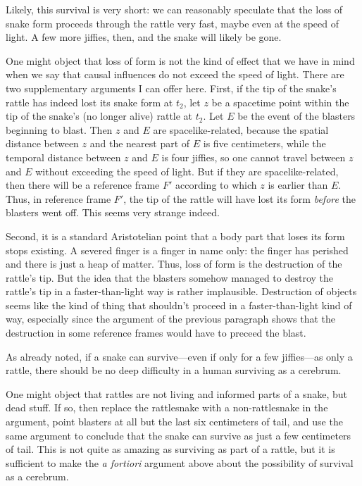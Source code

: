 Likely, this survival is very short: we can reasonably speculate that the loss of snake form proceeds through the rattle 
very fast, maybe even at the speed of light. A few more jiffies, then, and the snake will likely be gone.

One might object that loss of form is not the kind of effect that we have in mind when we say that causal influences do not 
exceed the speed of light. There are two supplementary arguments I can offer here. First, if the tip of the snake's rattle 
has indeed lost its snake form at $t_2$, let $z$ be a spacetime point within the tip of the snake's (no longer alive) rattle 
at $t_2$. Let $E$ be the event of the blasters beginning to blast. Then $z$ and $E$ are spacelike-related, because the spatial 
distance between $z$ and the nearest part of $E$ is five centimeters, while the temporal distance between $z$ and $E$ is four
jiffies, so one cannot travel between $z$ and $E$ without exceeding the speed of light. But if they are spacelike-related, then
there will be a reference frame $F'$ according to which $z$ is earlier than $E$. Thus, in reference frame $F'$, the tip of the 
rattle will have lost its form \textit{before} the blasters went off. This seems very strange indeed.

Second, it is a standard Aristotelian point that a body part that loses its form stops existing. A severed finger is a 
finger in name only: the finger has perished and there is just a heap of matter. Thus, loss of form is the destruction 
of the rattle's tip. But the idea that the blasters somehow managed to destroy the rattle's tip in a faster-than-light 
way is rather implausible. Destruction of objects seems like the kind of thing that shouldn't proceed in a faster-than-light
kind of way, especially since the argument of the previous paragraph shows that the destruction in some reference frames 
would have to preceed the blast. 

As already noted, if a snake can survive---even if only for a few jiffies---as only a rattle, there should be no deep 
difficulty in a human surviving as a cerebrum. 

One might object that rattles are not living and informed parts of a snake, but dead stuff. If so, then replace the 
rattlesnake with a non-rattlesnake in the argument, point blasters at all but the last six centimeters of tail, and 
use the same argument to conclude that the snake can survive as just a few centimeters of tail. This is not quite as 
amazing as surviving as part of a rattle, but it is sufficient to make the \textit{a fortiori} argument above about the 
possibility of survival as a cerebrum.

